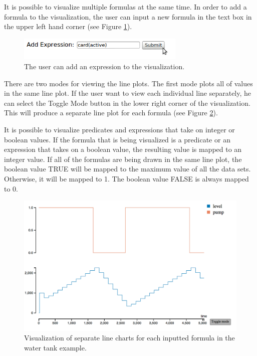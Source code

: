 It is possible to visualize multiple formulas at the same time. In order to add a formula to the visualization, the user can input a new formula in the text box in the upper left hand corner (see Figure \ref{timeVsValueUI}).

\begin{center}
\begin{figure}[h!]
\centering
\includegraphics[width=8cm]{bilder/timeVValueUI.png}
\caption{The user can add an expression to the visualization.}
\label{timeVsValueUI}
\end{figure}
\end{center}

There are two modes for viewing the line plots. The first mode plots all of values in the same line plot. If the user want to view each individual line separately, he can select the \textsf{Toggle Mode} button in the lower right corner of the visualization. This will produce a separate line plot for each formula (see Figure \ref{vOtEach}).

It is possible to visualize predicates and expressions that take on integer or boolean values. If the formula that is being visualized is a predicate or an expression that takes on a boolean value, the resulting value is mapped to an integer value. If all of the formulas are being drawn in the same line plot, the boolean value TRUE will be mapped to the maximum value of all the data sets. Otherwise, it will be mapped to 1. The boolean value FALSE is always mapped to 0.

\begin{center}
\begin{figure}[h!]
\centering
\includegraphics[width=15cm]{bilder/vOtEach.png}
\caption{Visualization of separate line charts for each inputted formula in the water tank example.}
\label{vOtEach}
\end{figure}
\end{center}